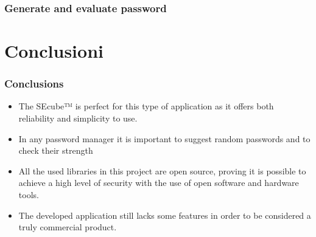 \documentclass[14pt,usenames,dvipsnames]{beamer}
\begin{document}
\begin{frame}
	\frametitle{Generate and evaluate password}
	\begin{center}
	\vspace{-0.4cm}
	\end{center}
\end{frame}

\section{Conclusioni}
\begin{frame}
	\frametitle{Conclusions}
	\begin{itemize}
		\setlength\itemsep{10pt}
		\item<1-> The SEcube™ is perfect for this type of application as it offers both reliability and simplicity to use.
		\item<2-> In any password manager it is important to suggest random passwords and to check their strength
		\item<3-> All the used libraries in this project are open source, proving it is possible to achieve a high level of security with the use of open software and hardware tools. 
		\item<4-> The developed application still lacks some features in order to be considered a truly commercial product.
	
	\end{itemize}
\end{frame}
\end{document}
